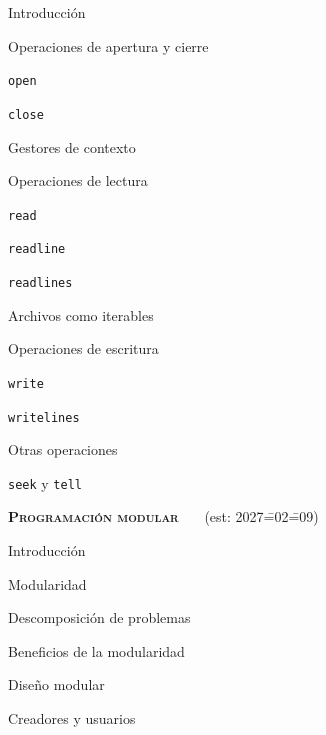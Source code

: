 \begin{longenum}
    \begin{longenum}
        \item Introducción
        \item Operaciones de apertura y cierre
        \begin{longenum}
            \item \texttt{open}
            \item \texttt{close}
            \item Gestores de contexto
        \end{longenum}
        \item Operaciones de lectura
        \begin{longenum}
            \item \texttt{read}
            \item \texttt{readline}
            \item \texttt{readlines}
            \item Archivos como iterables
        \end{longenum}
        \item Operaciones de escritura
        \begin{longenum}
            \item \texttt{write}
            \item \texttt{writelines}
        \end{longenum}
        \item Otras operaciones
        \begin{longenum}
            \item \texttt{seek} y \texttt{tell}
        \end{longenum}
    \end{longenum}
    \item \textbf{\textsc{Programación modular}} \ \ \ (est: 2027\==02\==09)
    \begin{longenum}
        \item Introducción
        \begin{longenum}
            \item Modularidad
            \item Descomposición de problemas
            \item Beneficios de la modularidad
        \end{longenum}
        \item Diseño modular
        \begin{longenum}
            \item Creadores y usuarios

\end{longenum}
\end{longenum}
\end{longenum}
